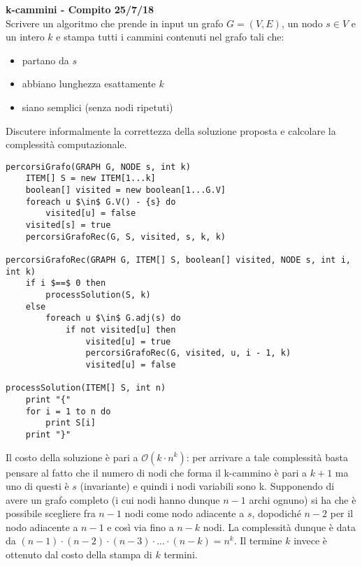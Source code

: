 \documentclass[../cheatSheetAlgoritmi.tex]{subfiles}
\begin{document}
\bigskip
\textbf{k-cammini - Compito 25/7/18}\\
Scrivere un algoritmo che prende in input un grafo $G= (V, E)$, un nodo $s \in V$ e un intero $k$ e stampa tutti i cammini contenuti nel grafo tali che:
\begin{itemize}
	\item partano da $s$
	\item abbiano lunghezza esattamente $k$
	\item siano semplici (senza nodi ripetuti)
\end{itemize}
Discutere informalmente la correttezza della soluzione proposta e calcolare la complessità computazionale.
\begin{lstlisting}[caption=Percorsi grafo]
percorsiGrafo(GRAPH G, NODE s, int k)
    ITEM[] S = new ITEM[1...k]
    boolean[] visited = new boolean[1...G.V]
    foreach u $\in$ G.V() - {s} do
        visited[u] = false
    visited[s] = true
    percorsiGrafoRec(G, S, visited, s, k, k)

percorsiGrafoRec(GRAPH G, ITEM[] S, boolean[] visited, NODE s, int i, int k)
    if i $==$ 0 then
        processSolution(S, k)
    else
        foreach u $\in$ G.adj(s) do
            if not visited[u] then
	            visited[u] = true
	            percorsiGrafoRec(G, visited, u, i - 1, k)
	            visited[u] = false
            
processSolution(ITEM[] S, int n)
    print "{"
    for i = 1 to n do
        print S[i]
    print "}"
\end{lstlisting}
Il costo della soluzione è pari a $\mathcal{O}(k \cdot n^{k})$: per arrivare a tale complessità basta pensare al fatto che il numero di nodi che forma il k-cammino è pari a $k+1$ ma uno di questi è $s$ (invariante) e quindi i nodi variabili sono k. Supponendo di avere un grafo completo (i cui nodi hanno dunque $n-1$ archi ognuno) si ha che è possibile scegliere fra $n-1$ nodi come nodo adiacente a $s$, dopodiché $n-2$ per il nodo adiacente a $n-1$ e così via fino a $n-k$ nodi. La complessità dunque è data da $(n-1) \cdot (n-2) \cdot (n-3) \cdot ... \cdot (n-k) = n^{k}$. Il termine $k$ invece è ottenuto dal costo della stampa di $k$ termini.
 
\end{document}

